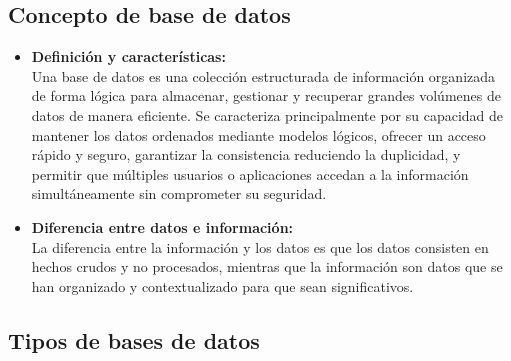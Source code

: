 \documentclass[12pt,a4paper]{article}
\begin{document}
\subsection{Concepto de base de datos}

\begin{itemize}
  \item \textbf{Definición y características:} \\
  Una base de datos es una colección estructurada de información organizada de forma lógica para almacenar, gestionar y recuperar grandes volúmenes de datos de manera eficiente. Se caracteriza principalmente por su capacidad de mantener los datos ordenados mediante modelos lógicos, ofrecer un acceso rápido y seguro, garantizar la consistencia reduciendo la duplicidad, y permitir que múltiples usuarios o aplicaciones accedan a la información simultáneamente sin comprometer su seguridad.\\

  \item \textbf{Diferencia entre datos e información:} \\
  La diferencia entre la información y los datos es que los datos consisten en hechos crudos y no procesados, mientras que la información son datos que se han organizado y contextualizado para que sean significativos.\\

\end{itemize}

\subsection{Tipos de bases de datos}
\end{document}
